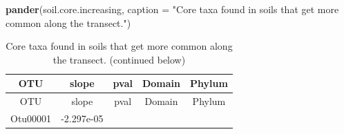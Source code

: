 \documentclass[]{article}
\newenvironment{Shaded}{\begin{snugshade}}{\end{snugshade}}
\newcommand{\KeywordTok}[1]{\textcolor[rgb]{0.13,0.29,0.53}{\textbf{#1}}}
\newcommand{\DataTypeTok}[1]{\textcolor[rgb]{0.13,0.29,0.53}{#1}}
\newcommand{\StringTok}[1]{\textcolor[rgb]{0.31,0.60,0.02}{#1}}
\newcommand{\NormalTok}[1]{#1}
\begin{document}
\begin{Shaded}
\begin{Highlighting}[]
\KeywordTok{pander}\NormalTok{(soil.core.increasing, }\DataTypeTok{caption =} \StringTok{"Core taxa found in soils that get more common along the transect."}\NormalTok{)}
\end{Highlighting}
\end{Shaded}

\begin{longtable}[]{@{}ccccc@{}}
\caption{Core taxa found in soils that get more common along the
transect. (continued below)}\tabularnewline
\toprule
\begin{minipage}[b]{0.13\columnwidth}\centering\strut
OTU\strut
\end{minipage} & \begin{minipage}[b]{0.16\columnwidth}\centering\strut
slope\strut
\end{minipage} & \begin{minipage}[b]{0.14\columnwidth}\centering\strut
pval\strut
\end{minipage} & \begin{minipage}[b]{0.13\columnwidth}\centering\strut
Domain\strut
\end{minipage} & \begin{minipage}[b]{0.20\columnwidth}\centering\strut
Phylum\strut
\end{minipage}\tabularnewline
\midrule
\endfirsthead
\toprule
\begin{minipage}[b]{0.13\columnwidth}\centering\strut
OTU\strut
\end{minipage} & \begin{minipage}[b]{0.16\columnwidth}\centering\strut
slope\strut
\end{minipage} & \begin{minipage}[b]{0.14\columnwidth}\centering\strut
pval\strut
\end{minipage} & \begin{minipage}[b]{0.13\columnwidth}\centering\strut
Domain\strut
\end{minipage} & \begin{minipage}[b]{0.20\columnwidth}\centering\strut
Phylum\strut
\end{minipage}\tabularnewline
\midrule
\endhead
\begin{minipage}[t]{0.13\columnwidth}\centering\strut
Otu00001\strut
\end{minipage} & \begin{minipage}[t]{0.16\columnwidth}\centering\strut
-2.297e-05\strut

\end{minipage}
\end{longtable}
\end{document}
